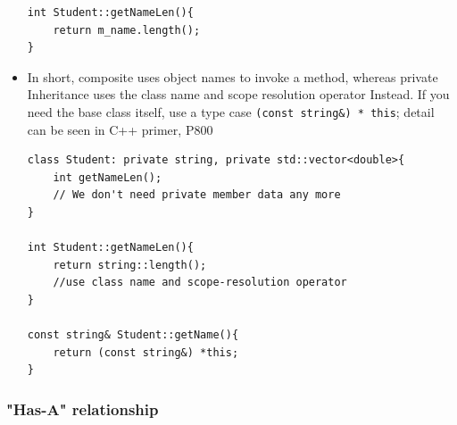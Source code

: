 \documentclass[a4paper,11pt,twoside]{book}
\begin{document}
\begin{itemize}
\begin{lstlisting}[numbers=none]
int Student::getNameLen(){
	return m_name.length();
}
\end{lstlisting}


\item In short, composite uses object names to invoke a method, whereas private Inheritance uses the class name and scope resolution operator Instead. If you need the base class itself, use a type case \texttt{(const string\&) * this}; detail can be seen in C++ primer, P800
\begin{lstlisting}[numbers=none]
class Student: private string, private std::vector<double>{
	int getNameLen();
	// We don't need private member data any more
}

int Student::getNameLen(){
	return string::length();
	//use class name and scope-resolution operator
}

const string& Student::getName(){
	return (const string&) *this;
}
\end{lstlisting}
\end{itemize}

\subsubsection{"Has-A" relationship}
\end{document}
